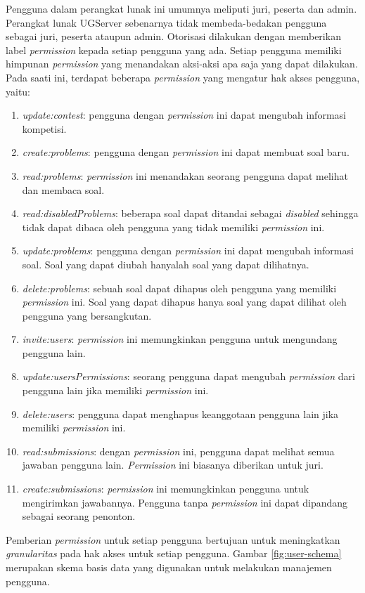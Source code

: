Pengguna dalam perangkat lunak ini umumnya meliputi juri, peserta dan admin. Perangkat lunak UGServer sebenarnya tidak membeda-bedakan pengguna sebagai juri, peserta ataupun admin. Otorisasi dilakukan dengan memberikan label \textit{permission} kepada setiap pengguna yang ada. Setiap pengguna memiliki himpunan \textit{permission} yang menandakan aksi-aksi apa saja yang dapat dilakukan. Pada saati ini, terdapat beberapa \textit{permission} yang mengatur hak akses pengguna, yaitu:
\begin{enumerate}
    \item \textit{update:contest}: pengguna dengan \textit{permission} ini dapat mengubah informasi kompetisi.
    \item \textit{create:problems}: pengguna dengan \textit{permission} ini dapat membuat soal baru.
    \item \textit{read:problems}: \textit{permission} ini menandakan seorang pengguna dapat melihat dan membaca soal.
    \item \textit{read:disabledProblems}: beberapa soal dapat ditandai sebagai \textit{disabled} sehingga tidak dapat dibaca oleh pengguna yang tidak memiliki \textit{permission} ini.
    \item \textit{update:problems}: pengguna dengan \textit{permission} ini dapat mengubah informasi soal. Soal yang dapat diubah hanyalah soal yang dapat dilihatnya.
    \item \textit{delete:problems}: sebuah soal dapat dihapus oleh pengguna yang memiliki \textit{permission} ini. Soal yang dapat dihapus hanya soal yang dapat dilihat oleh pengguna yang bersangkutan.
    \item \textit{invite:users}: \textit{permission} ini memungkinkan pengguna untuk mengundang pengguna lain.
    \item \textit{update:usersPermissions}: seorang pengguna dapat mengubah \textit{permission} dari pengguna lain jika memiliki \textit{permission} ini.
    \item \textit{delete:users}: pengguna dapat menghapus keanggotaan pengguna lain jika memiliki \textit{permission} ini.
    \item \textit{read:submissions}: dengan \textit{permission} ini, pengguna dapat melihat semua jawaban pengguna lain. \textit{Permission} ini biasanya diberikan untuk juri.
    \item \textit{create:submissions}: \textit{permission} ini memungkinkan pengguna untuk mengirimkan jawabannya. Pengguna tanpa \textit{permission} ini dapat dipandang sebagai seorang penonton.
\end{enumerate}
Pemberian \textit{permission} untuk setiap pengguna bertujuan untuk meningkatkan \textit{granularitas} pada hak akses untuk setiap pengguna. Gambar \ref{fig:user-schema} merupakan skema basis data yang digunakan untuk melakukan manajemen pengguna.

